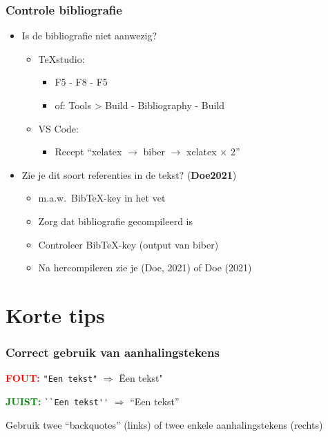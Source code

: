 \documentclass[aspectratio=169]{beamer}
\begin{document}
\begin{frame}
  \frametitle{Controle bibliografie}

  \begin{itemize}
    \item Is de bibliografie niet aanwezig?
          \begin{itemize}
            \item TeXstudio:
            \begin{itemize}
              \item F5 - F8 - F5
              \item of: Tools > Build - Bibliography - Build
            \end{itemize}
            \item VS Code:
            \begin{itemize}
              \item Recept ``xelatex $\rightarrow$ biber $\rightarrow$ xelatex $\times$ 2''
            \end{itemize}
          \end{itemize}
    \item Zie je dit soort referenties in de tekst? (\textbf{Doe2021})
          \begin{itemize}
            \item m.a.w.~Bib{\TeX}-key in het vet
            \item Zorg dat bibliografie gecompileerd is
            \item Controleer Bib{\TeX}-key (output van biber)
            \item Na hercompileren zie je (Doe, 2021) of Doe (2021)
          \end{itemize}
  \end{itemize}

\end{frame}

\section{Korte tips}

\begin{frame}[fragile]
  \frametitle{Correct gebruik van aanhalingstekens}

  \textcolor{red}{\textbf{FOUT:}} \verb|"Een tekst"| $\Rightarrow$ \"Een tekst"

  \bigskip

  \textcolor{green}{\textbf{JUIST:}} \verb|``Een tekst''| $\Rightarrow$ ``Een tekst''

  \bigskip

  Gebruik twee ``backquotes'' (links) of twee enkele aanhalingstekens (rechts)
\end{frame}
\end{document}
